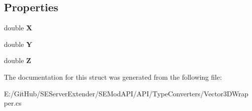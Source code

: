 \subsection*{Properties}
\begin{DoxyCompactItemize}
\item 
\hypertarget{struct_s_e_mod_a_p_i_1_1_a_p_i_1_1_type_converters_1_1_vector3_d_wrapper_aa85f671b330bdf4f05b4b66df4954fa2}{}double {\bfseries X}\label{struct_s_e_mod_a_p_i_1_1_a_p_i_1_1_type_converters_1_1_vector3_d_wrapper_aa85f671b330bdf4f05b4b66df4954fa2}

\item 
\hypertarget{struct_s_e_mod_a_p_i_1_1_a_p_i_1_1_type_converters_1_1_vector3_d_wrapper_a5928c08af398dcc8067349f36a43d0ae}{}double {\bfseries Y}\label{struct_s_e_mod_a_p_i_1_1_a_p_i_1_1_type_converters_1_1_vector3_d_wrapper_a5928c08af398dcc8067349f36a43d0ae}

\item 
\hypertarget{struct_s_e_mod_a_p_i_1_1_a_p_i_1_1_type_converters_1_1_vector3_d_wrapper_a3bfcd859e657d76e4695874dbd912802}{}double {\bfseries Z}\label{struct_s_e_mod_a_p_i_1_1_a_p_i_1_1_type_converters_1_1_vector3_d_wrapper_a3bfcd859e657d76e4695874dbd912802}

\end{DoxyCompactItemize}


The documentation for this struct was generated from the following file\+:\begin{DoxyCompactItemize}
\item 
E\+:/\+Git\+Hub/\+S\+E\+Server\+Extender/\+S\+E\+Mod\+A\+P\+I/\+A\+P\+I/\+Type\+Converters/Vector3\+D\+Wrapper.\+cs\end{DoxyCompactItemize}
